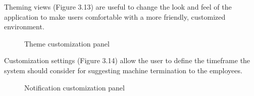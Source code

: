 \documentclass[licencjacka,en]{thesisclass}
\begin{document}
    Theming views (Figure 3.13) are useful to change the look and feel of the application
    to make users comfortable with a more friendly, customized environment.
    
    \begin{figure}[!htbp]
      \caption{Theme customization panel\label{fig:scr-theme}}
    \end{figure}

    Customization settings (Figure 3.14) allow the user to define the timeframe
    the system should consider for suggesting machine termination
    to the employees.

    \begin{figure}[!htbp]
      \caption{Notification customization panel\label{fig:scr-notify}}
    \end{figure}
    
\end{document}
